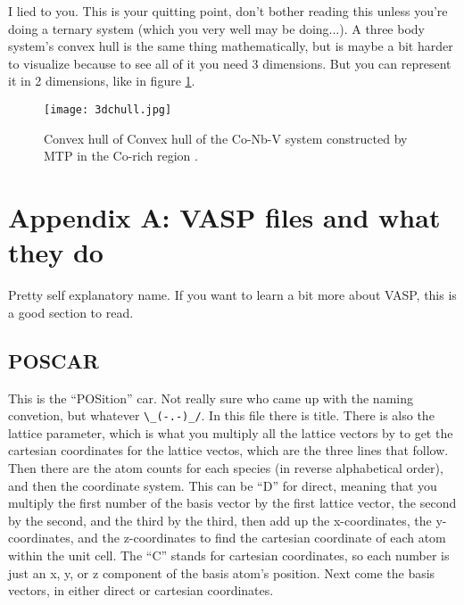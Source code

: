\documentclass{article}
\begin{document}
I lied to you. This is your quitting point, don't bother reading this unless you're doing a
ternary system (which you very well may be doing...). A three body system's convex hull
is the same thing mathematically, but is maybe a bit harder to
visualize because to see all of it you need 3 dimensions.  But you can
represent it in 2 dimensions, like in figure \ref{fig:3dchull}.

\begin{figure}[h]
  \centering
  \texttt{[image: 3dchull.jpg]}
  \caption{Convex hull of Convex hull of the Co-Nb-V system
    constructed by MTP in the Co-rich region
    \cite{gubaev2019accelerating}.  }
  \label{fig:3dchull}
\end{figure}


\FloatBarrier

\section*{Appendix A: VASP files and what they do} \label{sec:vaspinput} %
Pretty self explanatory name. If you want to learn a bit more about
VASP, this is a good section to read.

\subsection*{POSCAR}
This is the ``POSition'' car. Not really sure who came up with the
naming convetion, but whatever \verb|\_(-.-)_/|.
In this file there is title. There is also the lattice parameter,
which is what you multiply all the lattice vectors by to get the
cartesian coordinates for the lattice vectos, which are the three
lines that follow. Then there are the atom counts for each species (in
reverse alphabetical order), and then the coordinate system. This can
be ``D'' for direct, meaning that you multiply the first number of the
basis vector by the first lattice vector, the second by the second,
and the third by the third, then add up the x-coordinates, the
y-coordinates, and the z-coordinates to find the cartesian coordinate
of each atom within the unit cell. The ``C'' stands for cartesian
coordinates, so each number is just an x, y, or z component of the
basis atom's position. Next come the basis vectors, in either direct
or cartesian coordinates. 
\end{document}
